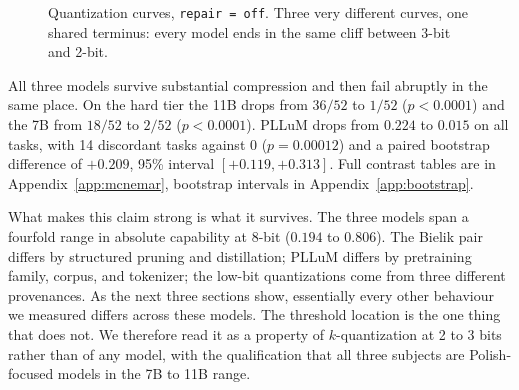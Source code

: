 \documentclass[11pt]{article}
\begin{document}
\begin{figure}[h]
\centering
{}
\caption{Quantization curves, \texttt{repair\,=\,off}. Three very different curves, one shared terminus: every model ends in the same cliff between 3-bit and 2-bit.}
\label{fig:curve}
\end{figure}

All three models survive substantial compression and then fail abruptly in the same place. On the hard tier the 11B drops from $36/52$ to $1/52$ ($p<0.0001$) and the 7B from $18/52$ to $2/52$ ($p<0.0001$). PLLuM drops from $0.224$ to $0.015$ on all tasks, with 14 discordant tasks against 0 ($p=0.00012$) and a paired bootstrap difference of $+0.209$, 95\% interval $[+0.119, +0.313]$. Full contrast tables are in Appendix~\ref{app:mcnemar}, bootstrap intervals in Appendix~\ref{app:bootstrap}.

What makes this claim strong is what it survives. The three models span a fourfold range in absolute capability at 8-bit ($0.194$ to $0.806$). The Bielik pair differs by structured pruning and distillation; PLLuM differs by pretraining family, corpus, and tokenizer; the low-bit quantizations come from three different provenances. As the next three sections show, essentially every other behaviour we measured differs across these models. The threshold location is the one thing that does not. We therefore read it as a property of $k$-quantization at 2 to 3 bits rather than of any model, with the qualification that all three subjects are Polish-focused models in the 7B to 11B range.
\end{document}
